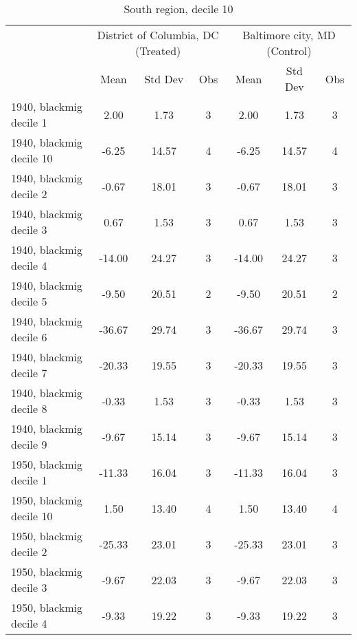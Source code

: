 \begin{table}[htbp]\centering
\def\sym#1{\ifmmode^{#1}\else\(^{#1}\)\fi}
\caption{South region, decile 10 \label{tab1}}
\begin{tabular}{l*{2}{ccc}}
\toprule
                    &\multicolumn{3}{c}{District of Columbia, DC (Treated)}&\multicolumn{3}{c}{Baltimore city, MD (Control)}\\
                    &        Mean&     Std Dev&         Obs&        Mean&     Std Dev&         Obs\\
\midrule
1940, blackmig decile 1&        2.00&        1.73&           3&        2.00&        1.73&           3\\
1940, blackmig decile 10&       -6.25&       14.57&           4&       -6.25&       14.57&           4\\
1940, blackmig decile 2&       -0.67&       18.01&           3&       -0.67&       18.01&           3\\
1940, blackmig decile 3&        0.67&        1.53&           3&        0.67&        1.53&           3\\
1940, blackmig decile 4&      -14.00&       24.27&           3&      -14.00&       24.27&           3\\
1940, blackmig decile 5&       -9.50&       20.51&           2&       -9.50&       20.51&           2\\
1940, blackmig decile 6&      -36.67&       29.74&           3&      -36.67&       29.74&           3\\
1940, blackmig decile 7&      -20.33&       19.55&           3&      -20.33&       19.55&           3\\
1940, blackmig decile 8&       -0.33&        1.53&           3&       -0.33&        1.53&           3\\
1940, blackmig decile 9&       -9.67&       15.14&           3&       -9.67&       15.14&           3\\
1950, blackmig decile 1&      -11.33&       16.04&           3&      -11.33&       16.04&           3\\
1950, blackmig decile 10&        1.50&       13.40&           4&        1.50&       13.40&           4\\
1950, blackmig decile 2&      -25.33&       23.01&           3&      -25.33&       23.01&           3\\
1950, blackmig decile 3&       -9.67&       22.03&           3&       -9.67&       22.03&           3\\
1950, blackmig decile 4&       -9.33&       19.22&           3&       -9.33&       19.22&           3\\

\end{tabular}
\end{table}
